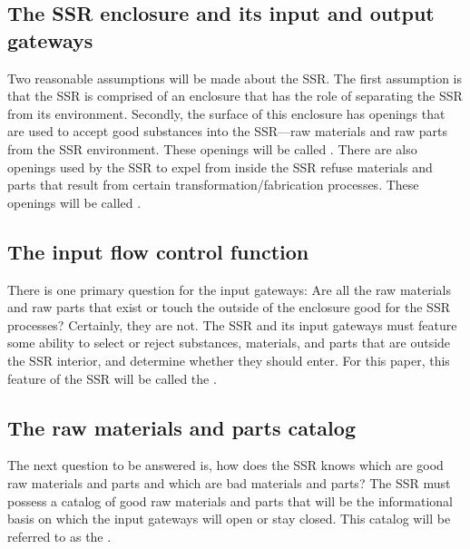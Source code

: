 \subsection[The SSR enclosure and its input and output gateways]{The SSR enclosure and its input and output gateways}

Two reasonable assumptions will be made about the SSR. The first assumption is
that the SSR is
comprised of an enclosure that has the role of separating the SSR from its
environment. Secondly, the surface of this enclosure has
openings that are used to accept good
substances into the SSR---raw materials and raw parts from the SSR environment. 
These openings will be called . There are also
openings used by the SSR to expel from inside the SSR refuse materials
and parts that result from certain transformation/fabrication processes.
These openings will be called .

\subsection[The input flow control function]{The input flow control
function}

There is one primary question
for the input gateways: Are all the raw materials and raw parts that
exist or touch the outside of the enclosure good for the SSR processes?
Certainly, they are not. The SSR and its input gateways must feature some
ability to select or reject substances, materials,
and parts that are outside the SSR interior, and determine whether they should enter. 
For this paper, this feature of the SSR will be called the .

\subsection[The raw materials and parts catalog]{The raw materials and
parts catalog}

The next question to be answered
is, how does the SSR knows which are good raw materials and parts
and which are bad materials and parts? The SSR must
possess a catalog of good raw materials and parts that will be the
informational basis on which the input gateways will open or stay
closed. This catalog will be referred to as the .

